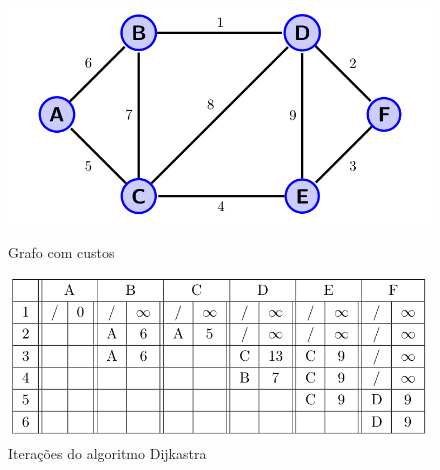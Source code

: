 \begin{figure}
  \begin{minipage}[c]{0.45\linewidth}
	\includegraphics[width=\linewidth]{./images/dijkastra_01.png}
	\caption{Grafo com custos}
	\label{fig:dijkastra_graph}
  \end{minipage}
  \hfill
  \begin{minipage}[c]{0.58\linewidth}
	\includegraphics[width=\linewidth]{./images/dijkastra_02.png}
	\caption{Iterações do algoritmo Dijkastra}
	\label{fig:dijkastra_table}
  \end{minipage}
\end{figure}

